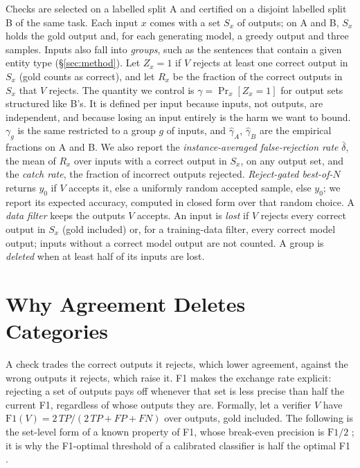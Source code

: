 \documentclass[11pt]{article}
\begin{document}
Checks are selected on a labelled split A and certified on a disjoint
labelled split B of the same task. Each input $x$ comes with a set $S_x$ of
outputs; on A and B, $S_x$ holds the gold output and, for each generating
model, a greedy output and three samples. Inputs also fall into
\emph{groups}, such as the sentences that contain a given entity type
(\S\ref{sec:method}). Let $Z_x=1$ if $V$ rejects at least one correct
output in $S_x$ (gold counts as correct), and let $R_x$ be the fraction of
the correct outputs in $S_x$ that $V$ rejects. The quantity we control is
$\gamma=\Pr_x[Z_x=1]$ for output sets structured like B's. It is defined
per input because inputs, not outputs, are independent, and because losing
an input entirely is the harm we want to bound. $\gamma_g$ is the same
restricted to a group $g$ of inputs, and $\hat\gamma_A$, $\hat\gamma_B$ are
the empirical fractions on A and B. We also report the
\emph{instance-averaged false-rejection rate} $\bar\delta$, the mean of
$R_x$ over inputs with a correct output in $S_x$, on any output set, and
the \emph{catch rate}, the fraction of incorrect outputs rejected.
\emph{Reject-gated best-of-$N$} returns $y_0$ if $V$ accepts it, else a
uniformly random accepted sample, else $y_0$; we report its expected
accuracy, computed in closed form over that random choice. A \emph{data filter} keeps
the outputs $V$ accepts. An input is \emph{lost} if $V$ rejects every
correct output in $S_x$ (gold included) or, for a training-data filter,
every correct model output; inputs without a correct model output are not
counted. A group is \emph{deleted} when at least half of its inputs are
lost.

\section{Why Agreement Deletes Categories}\label{sec:why}
A check trades the correct
outputs it rejects, which lower agreement, against the wrong outputs it
rejects, which raise it. F1 makes the exchange rate explicit: rejecting a
set of outputs pays off whenever that set is less precise than half the
current F1, regardless of whose outputs they are. Formally, let a verifier
$V$ have $\mathrm{F1}(V)=2\,TP/(2\,TP+FP+FN)$ over outputs, gold
included. The following is the set-level form of a known property of F1,
whose break-even precision is $\mathrm{F1}/2$
\citep[Lemma~12]{zhao2013beyond}; it is why the F1-optimal threshold of a
calibrated classifier is half the optimal F1 \citep{lipton2014optimal}.
\end{document}
